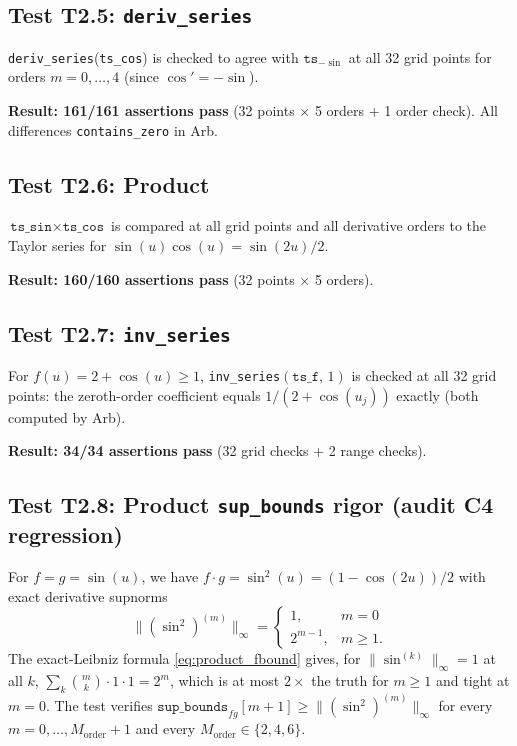 \documentclass[11pt]{article}
\theoremstyle{definition}
\begin{document}
\subsection{Test T2.5: \texttt{deriv\_series}}

\texttt{deriv\_series}(\texttt{ts\_cos}) is checked to agree with
$\texttt{ts}_{-\sin}$ at all 32 grid points for orders $m = 0,\ldots,4$
(since $\cos' = -\sin$).

\textbf{Result: 161/161 assertions pass} (32 points $\times$ 5 orders + 1 order check).
All differences \texttt{contains\_zero} in Arb.

\subsection{Test T2.6: Product}

$\texttt{ts\_sin} \times \texttt{ts\_cos}$ is compared at all grid points and
all derivative orders to the Taylor series for $\sin(u)\cos(u) = \sin(2u)/2$.

\textbf{Result: 160/160 assertions pass} (32 points $\times$ 5 orders).

\subsection{Test T2.7: \texttt{inv\_series}}

For $f(u) = 2 + \cos(u) \ge 1$, \texttt{inv\_series}$(\texttt{ts\_f},\, 1)$
is checked at all 32 grid points: the zeroth-order coefficient equals
$1/(2 + \cos(u_j))$ exactly (both computed by Arb).

\textbf{Result: 34/34 assertions pass} (32 grid checks + 2 range checks).

\subsection{Test T2.8: Product \texttt{sup\_bounds} rigor (audit C4 regression)}

For $f = g = \sin(u)$, we have $f \cdot g = \sin^2(u) = (1 - \cos(2u))/2$
with exact derivative supnorms
\[
  \|(\sin^2)^{(m)}\|_\infty = \begin{cases} 1, & m = 0 \\ 2^{m-1}, & m \ge 1. \end{cases}
\]
The exact-Leibniz formula \eqref{eq:product_fbound} gives, for $\|\sin^{(k)}\|_\infty = 1$ at all $k$,
$\sum_k \binom{m}{k} \cdot 1 \cdot 1 = 2^m$, which is at most $2\times$ the truth
for $m \ge 1$ and tight at $m = 0$. The test verifies
$\texttt{sup\_bounds}_{f g}[m{+}1] \ge \|(\sin^2)^{(m)}\|_\infty$ for every
$m = 0,\ldots,M_{\mathrm{order}}+1$ and every $M_{\mathrm{order}} \in \{2, 4, 6\}$.
\end{document}
